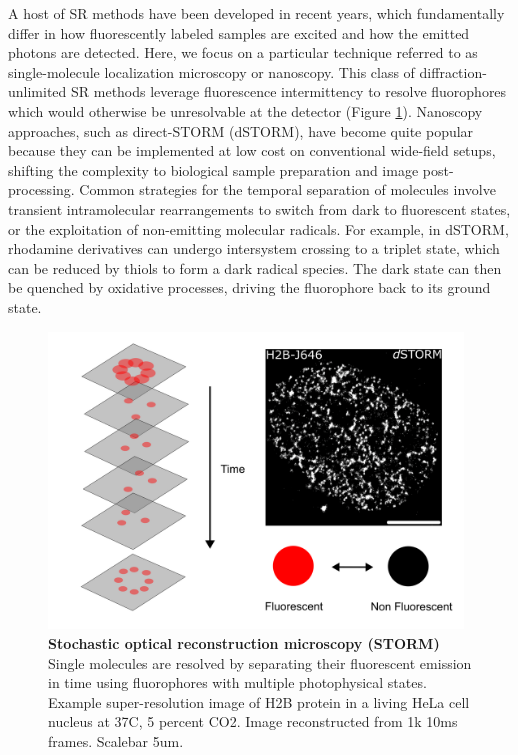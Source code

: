 A host of SR methods have been developed in recent years, which fundamentally differ in how fluorescently labeled samples are excited and how the emitted photons are detected. Here, we focus on a particular technique referred to as single-molecule localization microscopy or nanoscopy. This class of diffraction-unlimited SR methods leverage fluorescence intermittency to resolve fluorophores which would otherwise be unresolvable at the detector (Figure \ref{fig:fig1}). Nanoscopy approaches, such as direct-STORM (dSTORM), have become quite popular because they can be implemented at low cost on conventional wide-field setups, shifting the complexity to biological sample preparation and image post-processing. Common strategies for the temporal separation of molecules involve transient intramolecular rearrangements to switch from dark to fluorescent states, or the exploitation of non-emitting molecular radicals. For example, in dSTORM, rhodamine derivatives can undergo intersystem crossing to a triplet state, which can be reduced by thiols to form a dark radical species. The dark state can then be quenched by oxidative processes, driving the fluorophore back to its ground state. 

\begin{figure}[t]
\centering
\includegraphics[width=11cm]{media/Intro.png}
\caption{\textbf{Stochastic optical reconstruction microscopy (STORM)} Single molecules are resolved by separating their fluorescent emission in time using fluorophores with multiple photophysical states. Example super-resolution image of H2B protein in a living HeLa cell nucleus at 37C, 5 percent CO2. Image reconstructed from 1k 10ms frames. Scalebar 5um.}
\label{fig:fig1}
\end{figure}

